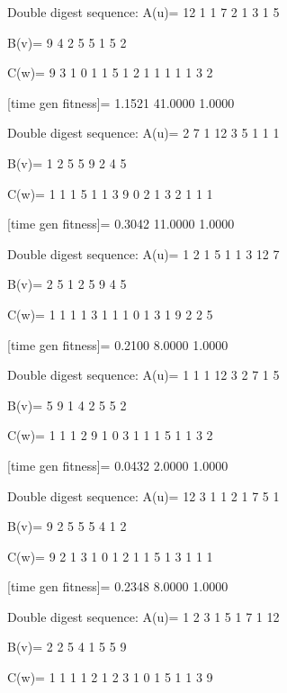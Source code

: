 Double digest sequence:
A(u)=
    12     1     1     7     2     1     3     1     5

B(v)=
     9     4     2     5     5     1     5     2

C(w)=
     9     3     1     0     1     1     5     1     2     1     1     1     1     1     3     2

[time gen fitness]=
    1.1521   41.0000    1.0000

Double digest sequence:
A(u)=
     2     7     1    12     3     5     1     1     1

B(v)=
     1     2     5     5     9     2     4     5

C(w)=
     1     1     1     5     1     1     3     9     0     2     1     3     2     1     1     1

[time gen fitness]=
    0.3042   11.0000    1.0000

Double digest sequence:
A(u)=
     1     2     1     5     1     1     3    12     7

B(v)=
     2     5     1     2     5     9     4     5

C(w)=
     1     1     1     1     3     1     1     1     0     1     3     1     9     2     2     5

[time gen fitness]=
    0.2100    8.0000    1.0000

Double digest sequence:
A(u)=
     1     1     1    12     3     2     7     1     5

B(v)=
     5     9     1     4     2     5     5     2

C(w)=
     1     1     1     2     9     1     0     3     1     1     1     5     1     1     3     2

[time gen fitness]=
    0.0432    2.0000    1.0000

Double digest sequence:
A(u)=
    12     3     1     1     2     1     7     5     1

B(v)=
     9     2     5     5     5     4     1     2

C(w)=
     9     2     1     3     1     0     1     2     1     1     5     1     3     1     1     1

[time gen fitness]=
    0.2348    8.0000    1.0000

Double digest sequence:
A(u)=
     1     2     3     1     5     1     7     1    12

B(v)=
     2     2     5     4     1     5     5     9

C(w)=
     1     1     1     1     2     1     2     3     1     0     1     5     1     1     3     9

